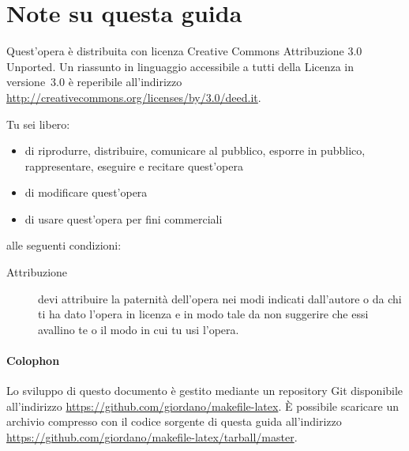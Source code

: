 \newpage{}
{}
\chapter*{Note su questa guida}
\label{cha:note-guida}

Quest'opera è distribuita con licenza Creative Commons Attribuzione 3.0
Unported.  Un riassunto in linguaggio accessibile a tutti della Licenza in
versione~3.0 è reperibile all'indirizzo
\url{http://creativecommons.org/licenses/by/3.0/deed.it}.

Tu sei libero:
\begin{itemize}
\item di riprodurre, distribuire, comunicare al pubblico, esporre in pubblico,
  rappresentare, eseguire e recitare quest'opera
\item di modificare quest'opera
\item di usare quest'opera per fini commerciali
\end{itemize}
alle seguenti condizioni:
\begin{description}
\item[Attribuzione] devi attribuire la paternità dell'opera nei modi indicati
  dall'autore o da chi ti ha dato l'opera in licenza e in modo tale da non
  suggerire che essi avallino te o il modo in cui tu usi l'opera.
\end{description}

\vfill{}
\subsubsection{Colophon}
\label{sec:colophon}

Lo sviluppo di questo documento è gestito mediante un repository Git disponibile
all'indirizzo \url{https://github.com/giordano/makefile-latex}.  È possibile
scaricare un archivio compresso con il codice sorgente di questa guida
all'indirizzo \url{https://github.com/giordano/makefile-latex/tarball/master}.

